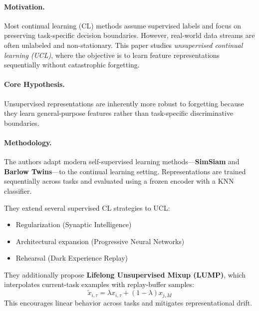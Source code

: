 \documentclass[12pt]{article}
\begin{document}
\psetheader %


\paragraph{Motivation.}
Most continual learning (CL) methods assume supervised labels and focus on preserving task-specific decision
boundaries. However, real-world data streams are often unlabeled and non-stationary. This paper studies
\emph{unsupervised continual learning (UCL)}, where the objective is to learn feature representations
sequentially without catastrophic forgetting.

\paragraph{Core Hypothesis.}
Unsupervised representations are inherently more robust to forgetting because they learn general-purpose
features rather than task-specific discriminative boundaries.

\paragraph{Methodology.}
The authors adapt modern self-supervised learning methods—\textbf{SimSiam} and \textbf{Barlow Twins}—to the
continual learning setting. Representations are trained sequentially across tasks and evaluated using a
frozen encoder with a KNN classifier.

They extend several supervised CL strategies to UCL:
\begin{itemize}
		\item Regularization (Synaptic Intelligence)
		\item Architectural expansion (Progressive Neural Networks)
		\item Rehearsal (Dark Experience Replay)
\end{itemize}

They additionally propose \textbf{Lifelong Unsupervised Mixup (LUMP)}, which interpolates current-task
examples with replay-buffer samples:
\[
		\tilde{x}_{i,\tau} = \lambda x_{i,\tau} + (1-\lambda)x_{j,M}
\]
This encourages linear behavior across tasks and mitigates representational drift.
\end{document}
